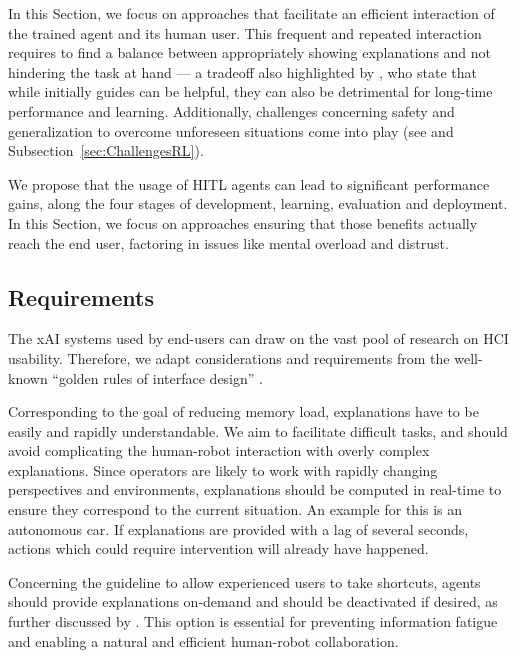 \documentclass[twoside,11pt]{article}
\begin{document}
\begin{enumerate}
In this Section, we focus on approaches that facilitate an efficient interaction of the trained agent and its human user. This frequent and repeated interaction requires to find a balance between appropriately showing explanations and not hindering the task at hand --- a tradeoff also highlighted by \citet{AndersonBischof:2013:PerformanceGestureGuides}, who state that while initially guides can be helpful, they can also be detrimental for long-time performance and learning. Additionally, challenges concerning safety and generalization to overcome unforeseen situations come into play (see \citet{RoyEtAl:2021:RLRoboticsChallenges} and Subsection~\ref{sec:ChallengesRL}). 

We propose that the usage of HITL agents can lead to significant performance gains, along the four stages of development, learning, evaluation and deployment. In this Section, we focus on approaches ensuring that those benefits actually reach the end user, factoring in issues like mental overload and distrust.

\subsection{Requirements}

The xAI systems used by end-users can draw on the vast pool of research on HCI usability. Therefore, we adapt considerations and requirements from the well-known ``golden rules of interface design'' \citep{ShneidermanEtAl:2016:GoldenRulesHCI}.

Corresponding to the goal of reducing memory load, explanations have to be easily and rapidly understandable. We aim to facilitate difficult tasks, and should avoid complicating the human-robot interaction with overly complex explanations. Since operators are likely to work with rapidly changing perspectives and environments, explanations should be computed in real-time to ensure they correspond to the current situation. An example for this is an autonomous car. If explanations are provided with a lag of several seconds, actions which could require intervention will already have happened.

Concerning the guideline to allow experienced users to take shortcuts, agents should provide explanations on-demand and should be deactivated if desired, as further discussed by \cite{AndersonBischof:2013:PerformanceGestureGuides}. This option is essential for preventing information fatigue and enabling a natural and efficient human-robot collaboration. 


\end{enumerate}
\end{document}
